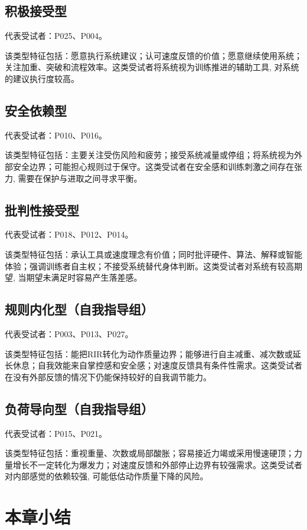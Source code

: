\subsection{积极接受型}
代表受试者：P025、P004。

该类型特征包括：愿意执行系统建议；认可速度反馈的价值；愿意继续使用系统；关注加重、突破和流程效率。这类受试者将系统视为训练推进的辅助工具, 对系统的建议执行度较高。

\subsection{安全依赖型}
代表受试者：P010、P016。

该类型特征包括：主要关注受伤风险和疲劳；接受系统减量或停组；将系统视为外部安全边界；可能担心规则过于保守。这类受试者在安全感和训练刺激之间存在张力, 需要在保护与进取之间寻求平衡。

\subsection{批判性接受型}
代表受试者：P018、P012、P014。

该类型特征包括：承认工具或速度理念有价值；同时批评硬件、算法、解释或智能体验；强调训练者自主权；不接受系统替代身体判断。这类受试者对系统有较高期望, 当期望未满足时容易产生落差感。

\subsection{规则内化型（自我指导组）}
代表受试者：P003、P013、P027。

该类型特征包括：能把RIR转化为动作质量边界；能够进行自主减重、减次数或延长休息；自我效能来自掌控感和安全感；对速度反馈具有条件性需求。这类受试者在没有外部反馈的情况下仍能保持较好的自我调节能力。

\subsection{负荷导向型（自我指导组）}
代表受试者：P015、P021。

该类型特征包括：重视重量、次数或局部酸胀；容易接近力竭或采用慢速硬顶；力量增长不一定转化为爆发力；对速度反馈和外部停止边界有较强需求。这类受试者对内部感觉的依赖较强, 可能低估动作质量下降的风险。

\section{本章小结}
\label{sec:chapter_summary}

